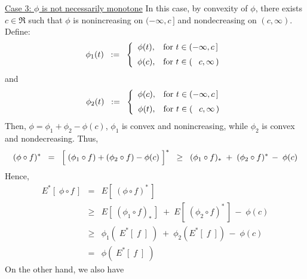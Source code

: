 \begin{enumerate}
	\vskip 0.0cm
	\underline{Case 3: $\phi$ is not necessarily monotone}
	\vskip 0.0cm
	\noindent
	In this case, by convexity of $\phi$, there exists $c \in \Re$
	such that $\phi$ is nonincreasing on $(-\infty,c\,]$
	and nondecreasing on $(c,\infty)$.
	Define:
	\begin{equation*}
	\phi_{1}(t)
	\;\; := \;\;
	\left\{\begin{array}{cl}
		\phi(t), & \textnormal{for $t \in (-\infty,c\,]$}
		\\
		\overset{{\color{white}+}}{\phi}(c), & \textnormal{for $t \in ({\color{white}-}c,\infty\,)$}
	\end{array}\right.
	\end{equation*}
	and
	\begin{equation*}
	\phi_{2}(t)
	\;\; := \;\;
	\left\{\begin{array}{cl}
		\phi(c), & \textnormal{for $t \in (-\infty,c\,]$}
		\\
		\overset{{\color{white}+}}{\phi}(t), & \textnormal{for $t \in ({\color{white}-}c,\infty\,)$}
	\end{array}\right.
	\end{equation*}
	Then, $\phi = \phi_{1} + \phi_{2} - \phi(c)$,
	$\phi_{1}$ is convex and nonincreasing, while $\phi_{2}$ is convex and nondecreasing.
	Thus,
	\begin{equation*}
	(\phi \circ f)^{*}
	\;\; = \;\;
		\left[\;(\phi_{1} \circ f) \overset{{\color{white}.}}{+} (\phi_{2} \circ f) - \phi(c)\;\right]^{*}
	\;\; \geq \;\;
		(\phi_{1} \circ f)_{*} \;+\; (\phi_{2} \circ f)^{*} \,-\; \phi(c)
	\end{equation*}
	Hence,
	\begin{eqnarray*}
	E^{*}\!\left[\;\phi \circ f\,\right]
	& = &
		E\!\left[\;(\phi \circ f)^{*}\,\right]
	\\
	& \geq &
		E\!\left[\;(\phi_{1} \circ f)_{*}\,\right]
		\;+\;
		E\!\left[\;(\phi_{2} \circ f)^{*}\,\right]
		\,-\; \phi(c)
	\\
	& \geq &
		\phi_{1}\!\left(\;E^{*}\!\left[\;f\;\right]\;\right)
		\;+\;
		\phi_{2}\!\left(E^{*}\!\left[\;f\;\right]\right)
		\,-\; \phi(c)
	\\
	& = &
		\phi\!\left(\;E^{*}\!\left[\;f\;\right]\;\right)
	\end{eqnarray*}
	On the other hand, we also have


\end{enumerate}
